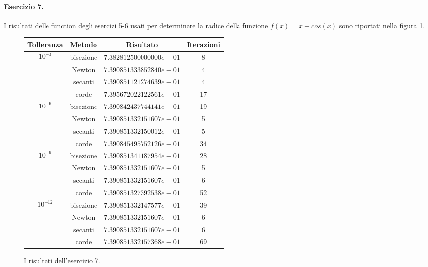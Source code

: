 \paragraph{Esercizio 7.} I risultati delle function degli esercizi 5-6 usati per determinare la radice della funzione $f(x) = x - cos(x)$ sono riportati nella figura \ref{fig:esercizio7}.

\begin{figure}
  \centering
  \begin{tabular}{ |c|c|c|c| }
    \hline
    Tolleranza & Metodo & Risultato & Iterazioni \\
    \hline\hline
    
    \multirow{4}{4em}{\[ 10^{-3} \]} & bisezione & $7.382812500000000e-01$ & 8 \\
    \cline{2-4}
    & Newton & $7.390851333852840e-01$ & 4 \\
    \cline{2-4}
    & secanti & $7.390851121274639e-01$ & 4 \\
    \cline{2-4}
    & corde & $7.395672022122561e-01$ & 17 \\
    \hline\hline
    
    \multirow{4}{4em}{\[ 10^{-6} \]} & bisezione & $7.390842437744141e-01$ & 19 \\
    \cline{2-4}
    & Newton & $7.390851332151607e-01$ & 5 \\
    \cline{2-4}
    & secanti & $7.390851332150012e-01$ & 5 \\
    \cline{2-4}
    & corde & $7.390845495752126e-01$ & 34 \\
    \hline\hline
    
    \multirow{4}{4em}{\[ 10^{-9} \]} & bisezione & $7.390851341187954e-01$ & 28 \\
    \cline{2-4}
    & Newton & $7.390851332151607e-01$ & 5 \\
    \cline{2-4}
    & secanti & $7.390851332151607e-01$ & 6 \\
    \cline{2-4}
    & corde & $7.390851327392538e-01$ & 52 \\
    \hline\hline
    
    \multirow{4}{4em}{\[ 10^{-12} \]} & bisezione & $7.390851332147577e-01$ & 39 \\
    \cline{2-4}
    & Newton & $7.390851332151607e-01$ & 6 \\
    \cline{2-4}
    & secanti & $7.390851332151607e-01$ & 6 \\
    \cline{2-4}
    & corde & $7.390851332157368e-01$ & 69 \\
    \hline
  \end{tabular}

  \caption{I risultati dell'esercizio 7.}
  \label{fig:esercizio7}
\end{figure}

